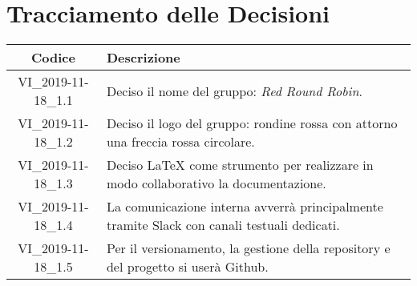\section*{Tracciamento delle Decisioni}

\begin{center}
	\begin{longtable}{|c|p{12.25cm}|}
	\hline
	\rowcolor{lighter-grayer}
	\textbf{Codice} & \textbf{Descrizione} \\
	\hline
	\endfirsthead

	\hline
	VI\_2019-11-18\_1.1 & Deciso il nome del gruppo: \textit{Red Round Robin}. \\
	\hline
	VI\_2019-11-18\_1.2 & Deciso il logo del gruppo: rondine rossa con attorno una freccia rossa circolare. \\
	\hline
	VI\_2019-11-18\_1.3 & Deciso \LaTeX{} come strumento per realizzare in modo collaborativo la documentazione. \\
	\hline
	VI\_2019-11-18\_1.4 & La comunicazione interna avverrà principalmente tramite Slack con canali testuali dedicati. \\
	\hline
	VI\_2019-11-18\_1.5 & Per il versionamento, la gestione della repository e del progetto si userà Github. \\
	\hline

	\end{longtable}
\end{center}

